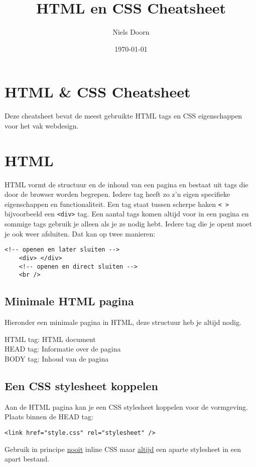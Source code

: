 \documentclass[8pt,pagesize,footinclude=false,headinclude=false]{scrartcl}
\title{HTML en CSS Cheatsheet}
\author{Niels Doorn}
\date{\today}
\begin{document}
\ifpdf
{}
\else
{}
\fi

\begin{multicols*}{4}

\section*{HTML \& CSS Cheatsheet}
Deze cheatsheet bevat de meest gebruikte HTML tags en CSS eigenschappen voor het vak webdesign.

\section*{HTML}
HTML vormt de structuur en de inhoud van een pagina en bestaat uit tags die door de browser worden begrepen. Iedere tag heeft zo z'n eigen specifieke eigenschappen en functionaliteit. Een tag staat tussen scherpe haken \texttt{< >} bijvoorbeeld een \texttt{<div>} tag. Een aantal tags komen altijd voor in een pagina en sommige tags gebruik je alleen als je ze nodig hebt. Iedere tag die je opent moet je ook weer afsluiten. Dat kan op twee manieren:
\begin{lstlisting}[language=HTML5]
	<!-- openen en later sluiten -->
	<div> </div>
	<!-- openen en direct sluiten -->
	<br />
\end{lstlisting}
\subsection*{Minimale HTML pagina}
Hieronder een minimale pagina in HTML, deze structuur heb je altijd nodig.

HTML tag: HTML document\\
HEAD tag: Informatie over de pagina\\
BODY tag: Inhoud van de pagina

\subsection*{Een CSS stylesheet koppelen}
Aan de HTML pagina kan je een CSS stylesheet koppelen voor de vormgeving.\\
\noindent Plaats binnen de HEAD tag:
\begin{lstlisting}[language=HTML5]
	<link href="style.css" rel="stylesheet" />
\end{lstlisting}
\noindent Gebruik in principe \underline{nooit} inline CSS maar \underline{altijd} een aparte stylesheet in een apart bestand.


\end{multicols*}
\end{document}

